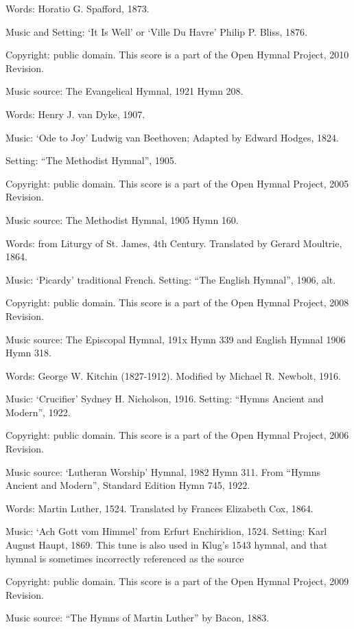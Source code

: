 \begin{multicols}{2}
\par\noindent
Words: Horatio G. Spafford, 1873.
\par\noindent
Music and Setting: `It Is Well' or `Ville Du Havre' Philip P. Bliss, 1876.
\par\noindent
Copyright: public domain. This score is a part of the Open Hymnal Project, 2010 Revision.
\par\noindent
Music source: The Evangelical Hymnal, 1921 Hymn 208.

\par\noindent
Words: Henry J. van Dyke, 1907. 
\par\noindent
Music: `Ode to Joy' Ludwig van Beethoven; Adapted by Edward Hodges, 1824. 
\par\noindent
Setting: ``The Methodist Hymnal'', 1905.
\par\noindent
Copyright: public domain. This score is a part of the Open Hymnal Project, 2005 Revision.
\par\noindent
Music source: The Methodist Hymnal, 1905 Hymn 160.

\par\noindent
Words: from Liturgy of St. James, 4th Century.  Translated by Gerard Moultrie, 1864. 
\par\noindent
Music: `Picardy' traditional French.  Setting: ``The English Hymnal'', 1906, alt.
\par\noindent
Copyright: public domain. This score is a part of the Open Hymnal Project, 2008 Revision.
\par\noindent
Music source: The Episcopal Hymnal, 191x Hymn 339 and English Hymnal 1906 Hymn 318.

\par\noindent
Words: George W. Kitchin (1827-1912). Modified by Michael R. Newbolt, 1916. 
\par\noindent
Music: `Crucifier' Sydney H. Nicholson, 1916.  Setting: ``Hymns Ancient and Modern'', 1922.
\par\noindent
Copyright: public domain. This score is a part of the Open Hymnal Project, 2006 Revision.
\par\noindent
Music source: `Lutheran Worship' Hymnal, 1982 Hymn 311.  From ``Hymns Ancient and Modern'', Standard Edition Hymn 745, 1922.

\par\noindent
Words: Martin Luther, 1524. Translated by Frances Elizabeth Cox, 1864. 
\par\noindent
Music: `Ach Gott vom Himmel' from Erfurt Enchiridion, 1524.  Setting: Karl August Haupt, 1869. This tune is also used in Klug's 1543 hymnal, and that hymnal is sometimes incorrectly referenced as the source
\par\noindent
Copyright: public domain. This score is a part of the Open Hymnal Project, 2009 Revision.
\par\noindent
Music source: ``The Hymns of Martin Luther'' by Bacon, 1883.


\end{multicols}
